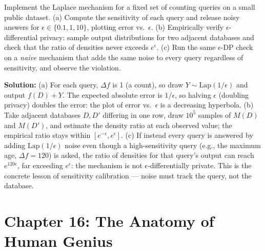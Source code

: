 \begin{exercise}[Computational]
Implement the Laplace mechanism for a fixed set of counting queries on a small public dataset. (a) Compute the sensitivity of each query and release noisy answers for $\epsilon \in \{0.1, 1, 10\}$, plotting error vs.\ $\epsilon$. (b) Empirically verify $\epsilon$-differential privacy: sample output distributions for two adjacent databases and check that the ratio of densities never exceeds $e^{\epsilon}$. (c) Run the same $\epsilon$-DP check on a \emph{naive} mechanism that adds the same noise to every query regardless of sensitivity, and observe the violation.
\end{exercise}
\textbf{Solution:} (a) For each query, $\Delta f$ is 1 (a count), so draw $Y \sim \mathrm{Lap}(1/\epsilon)$ and output $f(D) + Y$. The expected absolute error is $1/\epsilon$, so halving $\epsilon$ (doubling privacy) doubles the error: the plot of error vs.\ $\epsilon$ is a decreasing hyperbola. (b) Take adjacent databases $D, D'$ differing in one row, draw $10^5$ samples of $M(D)$ and $M(D')$, and estimate the density ratio at each observed value; the empirical ratio stays within $[e^{-\epsilon}, e^{\epsilon}]$. (c) If instead every query is answered by adding $\mathrm{Lap}(1/\epsilon)$ noise even though a high-sensitivity query (e.g., the maximum age, $\Delta f = 120$) is asked, the ratio of densities for that query's output can reach $e^{120\epsilon}$, far exceeding $e^{\epsilon}$: the mechanism is not $\epsilon$-differentially private. This is the concrete lesson of sensitivity calibration --- noise must track the query, not the database.

\section{Chapter 16: The Anatomy of Human Genius}

